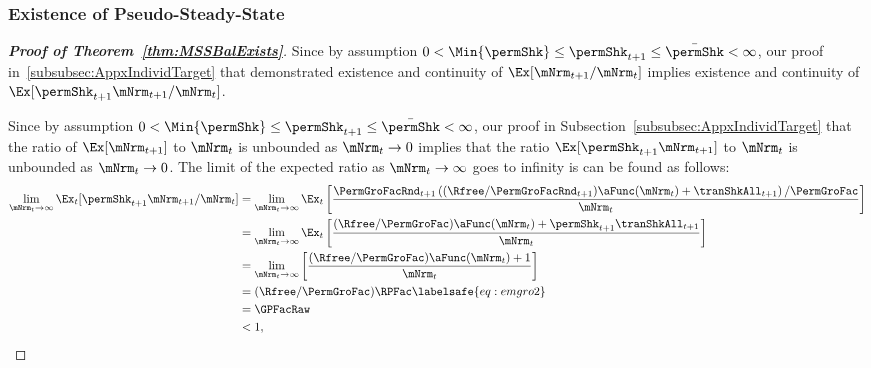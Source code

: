 \documentclass[\econtexRoot/BufferStockTheory]{subfiles}
\begin{document}
\subsubsection{Existence of Pseudo-Steady-State}\label{subsubsec:AppxPseudoSS}

\begin{proof}[\textbf{Proof of Theorem~\ref{thm:MSSBalExists}}]

Since by assumption $ 0 < \Min{\permShk} \leq \permShk_{t+1} \leq \bar{\permShk} < \infty$, our proof in~\ref{subsubsec:AppxIndividTarget} that demonstrated existence and continuity of $\Ex[\mNrm_{t+1}/\mNrm_{t}]$ implies existence and continuity of $\Ex[\permShk_{t+1}\mNrm_{t+1}/\mNrm_{t}]$.



Since by assumption $ 0 < \Min{\permShk} \leq \permShk_{t+1} \leq \bar{\permShk} < \infty$, our proof in Subsection~\ref{subsubsec:AppxIndividTarget} that the ratio of $\Ex[\mNrm_{t+1}]$ to $\mNrm_{t}$ is unbounded as $\mNrm_{t} \rightarrow 0$ implies that the ratio $\Ex[\permShk_{t+1}\mNrm_{t+1}]$ to $\mNrm_{t}$ is unbounded as $\mNrm_{t} \rightarrow 0$.
The limit of the expected ratio as $\mNrm_{t}\rightarrow \infty$ goes to infinity is can be found as follows:
%
\begin{equation}\begin{gathered}\begin{aligned}
  \lim_{\mNrm_{t} \rightarrow \infty} \Ex_{t}[\permShk_{t+1}\mNrm_{t+1}/\mNrm_{t}]  & =   
                                                                  \lim_{\mNrm_{t} \rightarrow \infty} 
                                                                  \Ex_{t}\left[\frac{\PermGroFacRnd_{t+1}\left((\Rfree/\PermGroFacRnd_{t+1})\aFunc(\mNrm_{t})+{\tranShkAll}_{t+1}\right)/\PermGroFac}{\mNrm_{t}}\right] \notag 
  \\   & =   \lim_{\mNrm_{t} \rightarrow \infty} \Ex_{t}\left[
         \frac{(\Rfree/\PermGroFac)\aFunc(\mNrm_{t})+\permShk_{t+1}{\tranShkAll}_{t+1}}{\mNrm_{t}}
         \right] \notag 
  \\   & =   \lim_{\mNrm_{t} \rightarrow \infty} \left[
         \frac{(\Rfree/\PermGroFac)\aFunc(\mNrm_{t})+1}{\mNrm_{t}}
         \right] \notag 
  \\  & = (\Rfree/\PermGroFac)\RPFac \labelsafe{eq:emgro2}
  \\  & = \GPFacRaw \notag
  \\  & < 1, \notag
\end{aligned}\end{gathered}\end{equation}


\end{proof}
\end{document}

